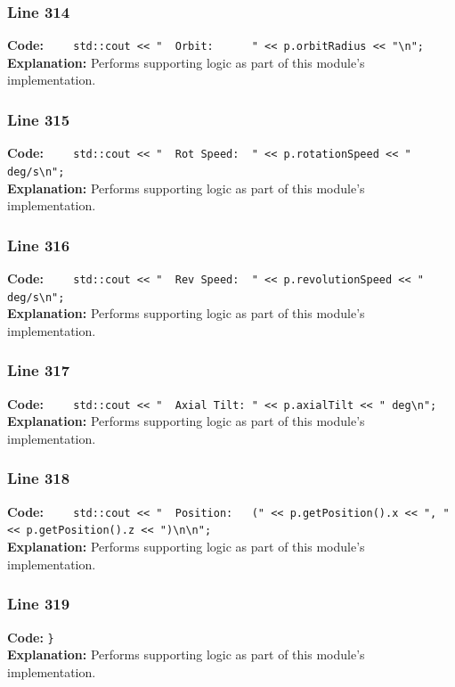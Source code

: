 \documentclass[11pt,a4paper]{article}
\begin{document}
\subsubsection*{Line 314}
\textbf{Code:} \verb|    std::cout << "  Orbit:      " << p.orbitRadius << "\n";|\\
\textbf{Explanation:} Performs supporting logic as part of this module's implementation.

\subsubsection*{Line 315}
\textbf{Code:} \verb|    std::cout << "  Rot Speed:  " << p.rotationSpeed << " deg/s\n";|\\
\textbf{Explanation:} Performs supporting logic as part of this module's implementation.

\subsubsection*{Line 316}
\textbf{Code:} \verb|    std::cout << "  Rev Speed:  " << p.revolutionSpeed << " deg/s\n";|\\
\textbf{Explanation:} Performs supporting logic as part of this module's implementation.

\subsubsection*{Line 317}
\textbf{Code:} \verb|    std::cout << "  Axial Tilt: " << p.axialTilt << " deg\n";|\\
\textbf{Explanation:} Performs supporting logic as part of this module's implementation.

\subsubsection*{Line 318}
\textbf{Code:} \verb|    std::cout << "  Position:   (" << p.getPosition().x << ", " << p.getPosition().z << ")\n\n";|\\
\textbf{Explanation:} Performs supporting logic as part of this module's implementation.

\subsubsection*{Line 319}
\textbf{Code:} \verb|}|\\
\textbf{Explanation:} Performs supporting logic as part of this module's implementation.
\end{document}
